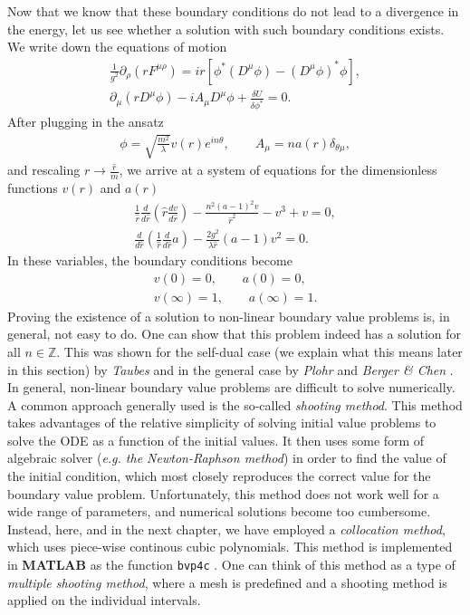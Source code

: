    \indent Now that we know that these boundary conditions do not lead to a divergence in the energy, let us see whether a solution with such boundary conditions exists. We write down the equations of motion
    \begin{align}
        \frac{1}{g^2}  \partial_{\rho}(r F^{\mu \rho}) = i r \left[\phi^* \left(D^{\mu}\phi\right) - \left(D^{\mu}\phi \right)^* \phi \right], \nonumber \\
        \partial_{\mu} \left(r D^{\mu} \phi \right) - i A_{\mu} D^{\mu} \phi + \frac{\delta U}{\delta \phi^*} =0.
    \end{align}
    After plugging in the ansatz
    \begin{align}
        \phi = \sqrt{\frac{m^2}{\lambda}}v(r) e^{i n \theta}, \qquad A_{\mu} = n a(r) \delta_{\theta \mu},
    \end{align}
    and rescaling $r\rightarrow \frac{\hat{r}}{m}$, we arrive at a system of equations for the dimensionless functions $v(r)$ and $a(r)$
    \begin{align}
        \frac{1}{\hat{r}} \frac{d }{d \hat{r}} \left(\hat{r} \frac{d v}{d \hat{r}} \right) - \frac{n^2 (a-1)^2 v}{\hat{r}^2} -v^3 +v =0, \label{eq:local_vortex_Higgs_scalar}  \\
        \frac{d}{d \hat{r}}\left(\frac{1}{\hat{r}}\frac{d}{d \hat{r}} a \right)- \frac{2 g^2}{\lambda \hat{r}} (a-1)v^2=0. \label{eq:local_vortex_Higgs_gauge}
    \end{align}
    In these variables, the boundary conditions become
    \begin{align}
        v(0) = 0, \qquad a(0)=0, \\
        v(\infty) =1, \qquad a(\infty) =1.
    \end{align}
    Proving the existence of a solution to non-linear boundary value problems is, in general, not easy to do. One can show that this problem indeed has a solution for all $n\in \mathbb{Z}$. This was shown for the self-dual case (we explain what this means later in this section) by \textit{Taubes} \cite{Taubes1980_1, Taubes1980_2}  and in the general case by \textit{Plohr} and \textit{Berger \& Chen} \cite{Plohr1981, Berger1989}. In general, non-linear boundary value problems are difficult to solve numerically. A common approach generally used is the so-called \textit{shooting method}. This method takes advantages of the relative simplicity of solving initial value problems to solve the ODE as a function of the initial values. It then uses some form of algebraic solver (\textit{e.g. the Newton-Raphson method}) in order to find the value of the initial condition, which most closely reproduces the correct value for the boundary value problem. Unfortunately, this method does not work well for a wide range of parameters, and numerical solutions become too cumbersome. Instead, here, and in the next chapter, we have employed a \textit{collocation method}, which uses piece-wise continous cubic polynomials. This method is implemented in \textbf{MATLAB} as the function \texttt{bvp4c} \cite{Kierzenka2001}. One can think of this method as a type of \textit{multiple shooting method}, where a mesh is predefined and a shooting method is applied on the individual intervals. \\
